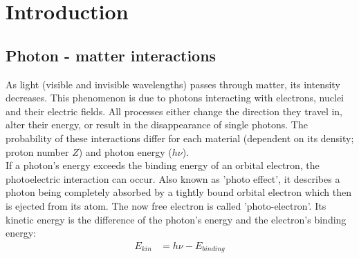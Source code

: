 \chapter{Introduction}
\label{chap:intro}



\section{Photon - matter interactions}
\label{sec:photon}

As light (visible and invisible wavelengths) passes through matter, its intensity decreases.
This phenomenon is due to photons interacting with electrons, nuclei and their electric fields.
All processes either change the direction they travel in, alter their energy, or result in the disappearance of single photons.
The probability of these interactions differ for each material (dependent on its density; proton number $Z$) and photon energy ($h\nu$). \\

If a photon's energy exceeds the binding energy of an orbital electron, the photoelectric interaction can occur.
Also known as 'photo effect', it describes a photon being completely absorbed by a tightly bound orbital electron which then is ejected from its atom.
The now free electron is called 'photo-electron'. Its kinetic energy is the difference of the photon's energy and the electron's binding energy:
\begin{align}
E_{kin} &= h\nu - E_{binding}
\end{align} \\

